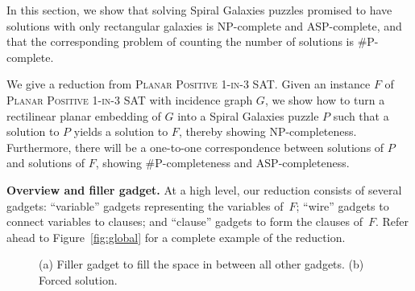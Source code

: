 In this section, we show that solving Spiral Galaxies puzzles promised to have solutions with only rectangular galaxies is NP-complete and ASP-complete, and that the corresponding problem of counting the number of solutions is \#P-complete. %


\iffalse
\begin{theorem}
	Determining whether a Spiral Galaxies puzzle is solvable with only rectangular galaxies is NP-complete.
\end{theorem}
\fi

We give a reduction from \textsc{Planar Positive 1-in-3 SAT}. Given an instance $F$ of \textsc{Planar Positive 1-in-3 SAT} with incidence graph $G$, we show how to turn a rectilinear planar embedding of $G$ into a Spiral Galaxies puzzle $P$ such that a solution to $P$ yields a solution to $F$, thereby showing NP-completeness.
Furthermore, there will be a one-to-one correspondence between solutions of $P$ and solutions of $F$, showing \#P-completeness and ASP-completeness. 

\textbf{Overview and filler gadget.}
At a high level, our reduction consists of several gadgets:
``variable'' gadgets representing the variables of~$F$;
``wire'' gadgets to connect variables to clauses;
and ``clause'' gadgets to form the clauses of~$F$.
Refer ahead to Figure~\ref{fig:global} for a complete example of the reduction.

 \begin{figure}
\centering
\hspace*{.25\textwidth}
\hfill
{}
\hspace*{.25\textwidth}
  \caption{\small (a) Filler gadget to fill the space in between all other gadgets. (b) Forced solution.}
  \label{fig:rect-face}
\end{figure}

